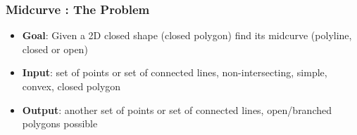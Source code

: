 




\begin{frame}[fragile]\frametitle{Midcurve : The Problem}

	\begin{itemize}
	\item {\bf Goal}: Given a 2D closed shape (closed polygon) find its midcurve (polyline, closed or open)
	\item {\bf Input}: set of points or set of connected lines, non-intersecting, simple, convex, closed polygon
	\item {\bf Output}: another set of points or set of connected lines, open/branched polygons possible
	\end{itemize}

\end{frame}


